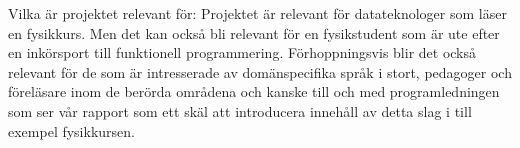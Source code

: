 \begin{draft}
Vilka är projektet relevant för:
Projektet är relevant för datateknologer som läser en fysikkurs. Men
det kan också bli relevant för en fysikstudent som är ute efter en
inkörsport till funktionell programmering. Förhoppningsvis blir det
också relevant för de som är intresserade av domänspecifika språk i
stort, pedagoger och föreläsare inom de berörda områdena och kanske
till och med programledningen som ser vår rapport som ett skäl att
introducera innehåll av detta slag i till exempel fysikkursen.

\end{draft}

